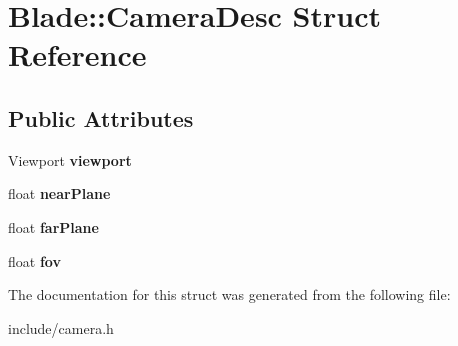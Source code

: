 \hypertarget{struct_blade_1_1_camera_desc}{}\section{Blade\+:\+:Camera\+Desc Struct Reference}
\label{struct_blade_1_1_camera_desc}
\subsection*{Public Attributes}
\begin{DoxyCompactItemize}
\item 
\mbox{\label{struct_blade_1_1_camera_desc_a82780a72df904a74d2b028a9ed7d2a98}} 
Viewport {\bfseries viewport}
\item 
\mbox{\label{struct_blade_1_1_camera_desc_aeb049c5373664a9e0697870a93ea60ef}} 
float {\bfseries near\+Plane}
\item 
\mbox{\label{struct_blade_1_1_camera_desc_ac779b00cee0a3e1b82ff22099f9f2be6}} 
float {\bfseries far\+Plane}
\item 
\mbox{\label{struct_blade_1_1_camera_desc_a520f1c4347cc9333350783de975fc499}} 
float {\bfseries fov}
\end{DoxyCompactItemize}


The documentation for this struct was generated from the following file\+:\begin{DoxyCompactItemize}
\item 
include/camera.\+h\end{DoxyCompactItemize}
